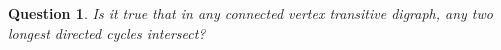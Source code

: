 \documentclass[english,11pt]{article}
\newtheorem{qn}[theorem]{Question}
\theoremstyle{definition}
\numberwithin{equation}{section}
\numberwithin{figure}{section}
\begin{document}

\begin{qn}
    Is it true that in any connected vertex transitive digraph, any two longest directed cycles intersect?
\end{qn}



\end{document}
